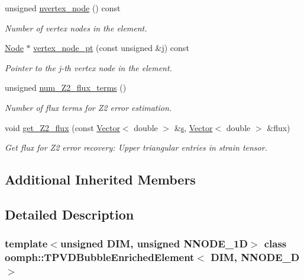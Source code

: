 \begin{DoxyCompactItemize}
unsigned \hyperlink{classoomph_1_1TPVDBubbleEnrichedElement_ab8cb112f848a59cd54f14e72143927eb}{nvertex\+\_\+node} () const
\begin{DoxyCompactList}\small\item\em Number of vertex nodes in the element. \end{DoxyCompactList}\item 
\hyperlink{classoomph_1_1Node}{Node} $\ast$ \hyperlink{classoomph_1_1TPVDBubbleEnrichedElement_a9ac6a29cd04c36787db97bc1c1c540e9}{vertex\+\_\+node\+\_\+pt} (const unsigned \&j) const
\begin{DoxyCompactList}\small\item\em Pointer to the j-\/th vertex node in the element. \end{DoxyCompactList}\item 
unsigned \hyperlink{classoomph_1_1TPVDBubbleEnrichedElement_a5ac20ef9354f134de8b1ec8be4b0f6c4}{num\+\_\+\+Z2\+\_\+flux\+\_\+terms} ()
\begin{DoxyCompactList}\small\item\em Number of \textquotesingle{}flux\textquotesingle{} terms for Z2 error estimation. \end{DoxyCompactList}\item 
void \hyperlink{classoomph_1_1TPVDBubbleEnrichedElement_a7ce226afdc77f8ea5aa300b8026e4809}{get\+\_\+\+Z2\+\_\+flux} (const \hyperlink{classoomph_1_1Vector}{Vector}$<$ double $>$ \&\hyperlink{cfortran_8h_ab7123126e4885ef647dd9c6e3807a21c}{s}, \hyperlink{classoomph_1_1Vector}{Vector}$<$ double $>$ \&flux)
\begin{DoxyCompactList}\small\item\em Get \textquotesingle{}flux\textquotesingle{} for Z2 error recovery\+: Upper triangular entries in strain tensor. \end{DoxyCompactList}\end{DoxyCompactItemize}
\subsection*{Additional Inherited Members}


\subsection{Detailed Description}
\subsubsection*{template$<$unsigned D\+IM, unsigned N\+N\+O\+D\+E\+\_\+1D$>$\newline
class oomph\+::\+T\+P\+V\+D\+Bubble\+Enriched\+Element$<$ D\+I\+M, N\+N\+O\+D\+E\+\_\+D $>$}

